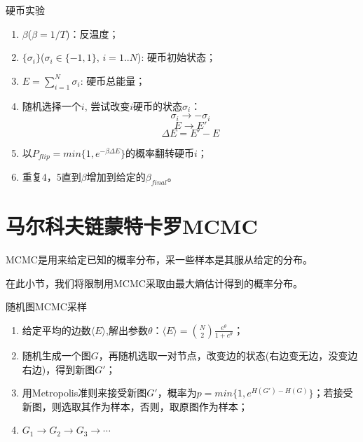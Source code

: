 \documentclass[normal,cn, 11pt]{elegantnote}
\begin{document}
\begin{example}
硬币实验
\begin{enumerate}
  \item $\beta$($\beta=1/T$)：反温度；
  \item $\{\sigma_i\}$($\sigma_i \in \{-1, 1\}$, $i=1..N$): 硬币初始状态；
  \item $E=\sum_{i=1}^N \sigma_i$: 硬币总能量；
  \item 随机选择一个$i$, 尝试改变$i$硬币的状态$\sigma_i$：
    $$\sigma_i \rightarrow -\sigma_i$$
    $$E \rightarrow E'$$
    $$\Delta E = E' - E$$
  \item 以$P_{flip}=min\{1, e^{-\beta \Delta E}\}$的概率翻转硬币$i$；
  \item 重复4，5直到$\beta$增加到给定的$\beta_{final}$。
\end{enumerate}
\end{example}
\section{马尔科夫链蒙特卡罗MCMC}\label{sec:mcmc}
MCMC是用来给定已知的概率分布，采一些样本是其服从给定的分布。

在此小节，我们将限制用MCMC采取由最大熵估计得到的概率分布。

\begin{example}[]
随机图MCMC采样
\begin{enumerate}
  \item 给定平均的边数$\langle E \rangle$,解出参数$\theta$：$\langle E \rangle = \binom{N}{2}\frac{e^{\theta}}{1+e^{\theta}}$；
  \item 随机生成一个图$G$，再随机选取一对节点，改变边的状态(右边变无边，没变边右边)，得到新图$G'$；
  \item 用Metropolis准则来接受新图$G'$，概率为$p=min\{1,e^{H(G')-H(G)}\}$；若接受新图，则选取其作为样本，否则，取原图作为样本；
  \item $G_1 \rightarrow G_2 \rightarrow G_3 \rightarrow \cdots$
\end{enumerate}
\end{example}
\end{document}
